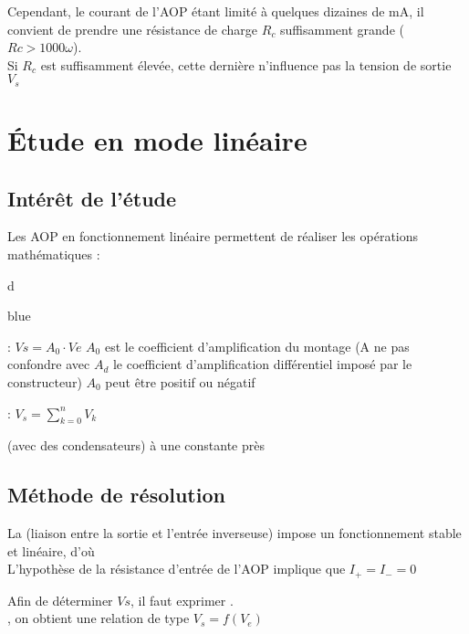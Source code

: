 Cependant, le courant de l’AOP étant limité à quelques dizaines de mA, il convient de prendre une résistance de charge $R_c$ suffisamment grande ($Rc>1000 \omega$). \\

Si $R_{c}$ est suffisamment élevée, cette dernière n’influence pas la tension de sortie $V_s$ \\



\chapter{Étude en mode linéaire}
\section{Intérêt de l’étude }

Les AOP en fonctionnement linéaire permettent de réaliser les opérations mathématiques :

d\begin{items}{blue}{\Triangle}
  \item {} : $Vs=A_0 \cdot Ve$
  $A_0$ est le coefficient d’amplification du montage (A ne pas confondre avec $A_d$ le coefficient d’amplification différentiel 
  imposé par le constructeur)
  $A_0$ peut être positif ou négatif
  \item {} : $V_s=\sum_{k=0}^{n} V_k$
  \item {} (avec des condensateurs) à une constante près
  \item {}
\end{items}

\section{Méthode de résolution}
La  (liaison entre la sortie et l’entrée inverseuse) impose un fonctionnement stable et linéaire, 
d'où  \\

L’hypothèse de la résistance d’entrée de l’AOP implique que $I_+=I_-=0$

Afin de déterminer $Vs$, il faut exprimer . \\

, on obtient une relation de type $V_s = f(V_e)$


